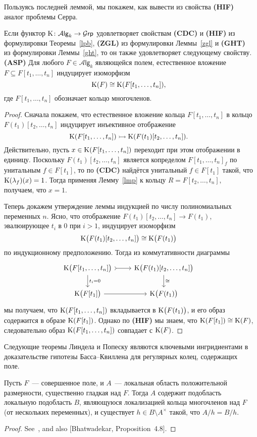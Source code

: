 \documentclass[oneside, 11pt]{amsart} \pdfoutput=1
\begin{document}
Пользуясь последней леммой, мы покажем, как вывести из свойства {\bf(HIF)} аналог проблемы Серра.
\begin{lemma}
\label{asp}
Если функтор ${\mathrm{K}}\colon\mathcal A\mathsf{lg}_k\rightarrow\mathcal G\mathsf{rp}$ удовлетворяет свойствам {\bf(CDC)} и {\bf(HIF)} из формулировки Теоремы~\ref{lpb}, {\bf(ZGL)} из формулировки Леммы~\ref{zgl} и {\bf(GHT)} из формулировки Леммы~\ref{ght}, то он также удовлетворяет следующему свойству.\\
{\bf(ASP)} Для любого $F\in\mathcal A\mathsf{lg}_k$ являющейся полем, естественное вложение $F\subseteq F[t_1,\ldots,t_n]$ индуцирует изоморфизм
$$
{\mathrm{K}}(F)\cong{\mathrm{K}}(F[t_1,\ldots,t_n]),
$$
где $F[t_1,\ldots,t_n]$ обозначает кольцо многочленов.
\end{lemma}
\begin{proof}
Сначала покажем, что естественное вложение кольца $F[t_1,\ldots,t_n]$ в кольцо $F(t_1)[t_2,\ldots,t_n]$ индуцирует инъективное отображение
$$
{\mathrm{K}}(F[t_1,\ldots,t_n])\rightarrowtail{\mathrm{K}}(F(t_1)[t_2,\ldots,t_n]).
$$
Действительно, пусть $x\in{\mathrm{K}}(F[t_1,\ldots,t_n])$ переходит при этом отображении в единицу. Поскольку $F(t_1)[t_2,\ldots,t_n]$ является копределом $F[t_1,\ldots,t_n]_f$ по унитальным $f\in F[t_1]$, то по {\bf(CDC)} найдётся унитальный $f\in F[t_1]$ такой, что ${\mathrm{K}}(\lambda_f)(x)=1$. Тогда применяя Лемму~\ref{lmp} к кольцу $R=F[t_2,\ldots,t_n]$, получаем, что $x=1$. 

Теперь докажем утверждение леммы индукцией по числу полиномиальных переменных $n$. Ясно, что отображение $F(t_1)[t_2,\ldots,t_n]\rightarrow F(t_1)$, эвалюирующее $t_i$ в $0$ при $i>1$, индуцирует изоморфизм
$$
{\mathrm{K}}\big(F(t_1)[t_2,\ldots,t_n]\big)\cong{\mathrm{K}}\big(F(t_1)\big)
$$
по индукционному предположению. Тогда из коммутативности диаграммы
$$\begin{tikzcd}
\K\bigl(F[t_1, \ldots, t_n]\bigr) \ar[tail]{r} \ar{d}{t_i=0} & \K\bigl(F(t_1)[t_2, \ldots, t_n]\bigr) \ar{d}{\cong}\\
\K\bigl(F[t_1]\bigr) \ar{r} & \K\bigl(F(t_1)\bigr)
\end{tikzcd}$$
мы получаем, что ${\mathrm{K}}(F[t_1,\ldots,t_n])$ вкладывается в ${\mathrm{K}}\big(F(t_1)\big)$, и его образ содержится в образе ${\mathrm{K}}(F[t_1])$. Однако по {\bf(HIF)} мы знаем, что ${\mathrm{K}}(F[t_1])\cong{\mathrm{K}}(F)$, следовательно образ ${\mathrm{K}}(F[t_1,\ldots,t_n])$ совпадает с ${\mathrm{K}}(F)$.
\end{proof}

Следующие теоремы Линдела и Попеску являются ключевыми ингридиентами в доказательстве гипотезы Басса--Квиллена для регулярных колец, содержащих поле. 
\begin{theorem}[Lindel]
\label{lindel}
Пусть $F$~--- совершенное поле, и $A$~--- локальная область положительной размерности, существенно гладкая над $F$. Тогда $A$ содержит подобласть локальную подобласть $B$, являющуюся локализацией кольца многочленов над $F$ {\rm(}от нескольких переменных{\rm)}, и существует $h\in B\setminus A^\times$ такой, что $A/h=B/h$. 
\end{theorem}
\begin{proof} See~\cite[Lemma, Proposition~2 and~2']{Li81}, \cite[Proposition~3.2]{Vo81} and also [Bhatwadekar, Proposition~4.8]. \end{proof}
\end{document}
